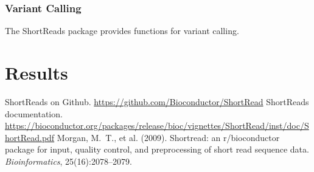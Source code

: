 \documentclass[12pt]{article}
\begin{document}
\subsubsection{Variant Calling}
The ShortReads package provides functions for variant calling.

\section{Results}


\begin{thebibliography}{10}
ShortReads on Github.
\newblock \url{https://github.com/Bioconductor/ShortRead}
ShortReads documentation.
\newblock \url{https://bioconductor.org/packages/release/bioc/vignettes/ShortRead/inst/doc/ShortRead.pdf}
Morgan, M.~T., et al. (2009).
\newblock Shortread: an r/bioconductor package for input, quality control, and
  preprocessing of short read sequence data.
\newblock \emph{Bioinformatics}, 25(16):2078--2079.
\end{thebibliography}
\end{document}
